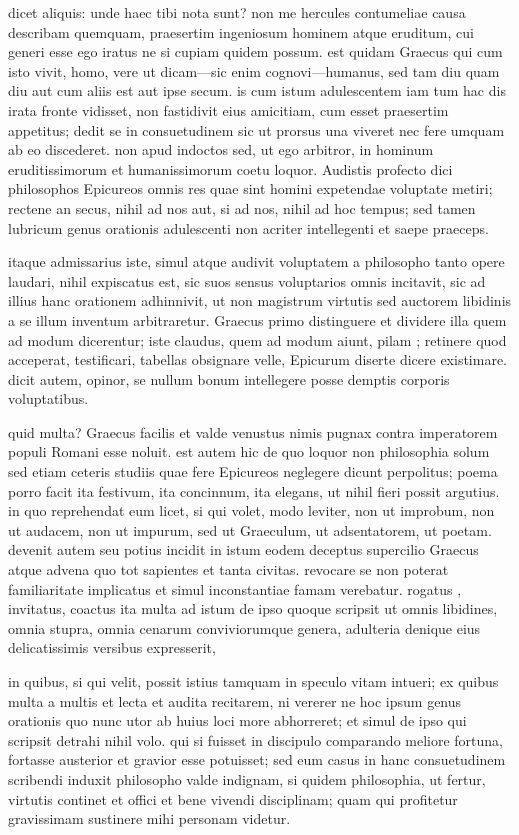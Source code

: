  dicet aliquis: unde haec tibi nota sunt? non me hercules contumeliae causa describam quemquam, praesertim ingeniosum hominem atque eruditum, cui generi esse ego iratus ne si cupiam quidem possum. est quidam Graecus qui cum isto vivit, homo, vere ut dicam—sic enim cognovi—humanus, sed tam diu quam diu aut cum aliis est aut ipse secum. is cum istum adulescentem iam tum hac dis irata fronte vidisset, non fastidivit eius amicitiam, cum esset praesertim appetitus; dedit se in consuetudinem sic ut prorsus una viveret nec fere umquam ab eo discederet. non apud indoctos sed, ut ego arbitror, in hominum eruditissimorum et humanissimorum coetu loquor. Audistis profecto dici philosophos Epicureos omnis res quae sint homini expetendae voluptate metiri; rectene an secus, nihil ad nos aut, si ad nos, nihil ad hoc tempus; sed tamen lubricum genus orationis adulescenti non acriter intellegenti et saepe praeceps.

 itaque admissarius iste, simul atque audivit voluptatem a philosopho tanto opere laudari, nihil expiscatus est, sic suos sensus voluptarios omnis incitavit, sic ad illius hanc orationem adhinnivit, ut non magistrum virtutis sed auctorem libidinis a se illum inventum arbitraretur. Graecus primo distinguere et dividere illa quem ad modum dicerentur; iste claudus, quem ad modum aiunt, pilam ; retinere quod acceperat, testificari, tabellas obsignare velle, Epicurum diserte dicere existimare. dicit autem, opinor, se nullum bonum intellegere posse demptis corporis voluptatibus.

 quid multa? Graecus facilis et valde venustus nimis pugnax contra imperatorem populi Romani esse noluit. est autem hic de quo loquor non philosophia solum sed etiam ceteris studiis quae fere Epicureos neglegere dicunt perpolitus; poema porro facit ita festivum, ita concinnum, ita elegans, ut nihil fieri possit argutius. in quo reprehendat eum licet, si qui volet, modo leviter, non ut improbum, non ut audacem, non ut impurum, sed ut Graeculum, ut adsentatorem, ut poetam. devenit autem seu potius incidit in istum eodem deceptus supercilio Graecus atque advena quo tot sapientes et tanta civitas. revocare se non poterat familiaritate implicatus et simul inconstantiae famam verebatur. rogatus , invitatus, coactus ita multa ad istum de ipso quoque scripsit ut omnis libidines, omnia stupra, omnia cenarum conviviorumque genera, adulteria denique eius delicatissimis versibus expresserit,

 in quibus, si qui velit, possit istius tamquam in speculo vitam intueri; ex quibus multa a multis et lecta et audita recitarem, ni vererer ne hoc ipsum genus orationis quo nunc utor ab huius loci more abhorreret; et simul de ipso qui scripsit detrahi nihil volo. qui si fuisset in discipulo comparando meliore fortuna, fortasse austerior et gravior esse potuisset; sed eum casus in hanc consuetudinem scribendi induxit philosopho valde indignam, si quidem philosophia, ut fertur, virtutis continet et offici et bene vivendi disciplinam; quam qui profitetur gravissimam sustinere mihi personam videtur.

